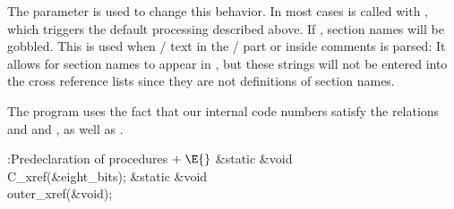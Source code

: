 The parameter  is used to change this behavior. In most
cases
 is called with , which
triggers the default
processing described above. If ,
section names will
be gobbled. This is used when \CEE/ text in the \TEX/ part or inside comments
is parsed: It allows for section names to appear in \pb, but these
strings will not be entered into the cross reference lists since they are not
definitions of section names.

The program uses the fact that our internal code numbers satisfy
the relations  and  and ,
as well as .

\Y\B\4:Predeclaration of procedures\X${}\mathrel+\E{}$\6
\&{static} \&{void} \\{C\_xref}(\&{eight\_bits});\6
\&{static} \&{void} \\{outer\_xref}(\&{void});\par
\fi

